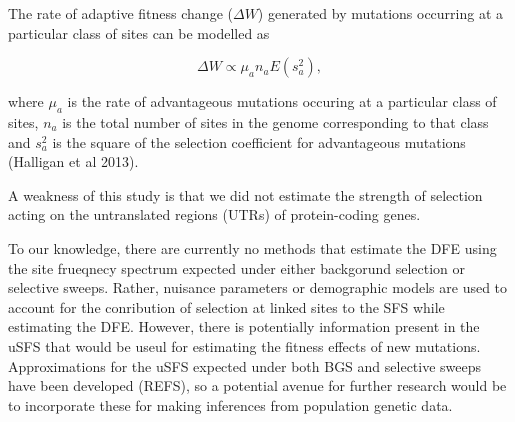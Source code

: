 \documentclass{article}
\begin{document}
The rate of adaptive fitness change ($\Delta W$) generated by mutations occurring at a particular class of sites can be modelled as

\begin{equation}
\label{eq:fitness}
\Delta W \propto \mu_a n_a E(s_a^2),
\end{equation}

where $\mu_a$ is the rate of advantageous mutations occuring at a particular class of sites, \textit{$n_a$} is the total number of sites in the genome corresponding to that class and \textit{$s_a^2$} is the square of the selection coefficient for advantageous mutations (Halligan et al 2013). 



A weakness of this study is that we did not estimate the strength of selection acting on the untranslated regions (UTRs) of protein-coding genes.

To our knowledge, there are currently no methods that estimate the DFE using the site frueqnecy spectrum expected under either backgorund selection or selective sweeps. Rather, nuisance parameters or demographic models are used to account for the conribution of selection at linked sites to the SFS while estimating the DFE. However, there is potentially information present in the uSFS that would be useul for estimating the fitness effects of new mutations. Approximations for the uSFS expected under both BGS and selective sweeps have been developed (REFS), so a potential avenue for further research would be to incorporate these for making inferences from population genetic data.
\end{document}
